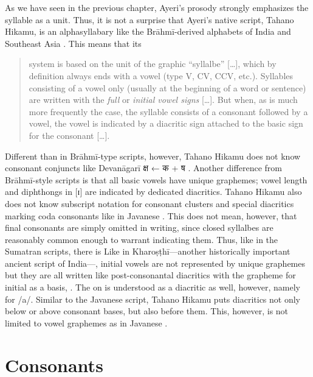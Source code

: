 As we have seen in the previous chapter, Ayeri's prosody strongly emphasizes 
the syllable as a unit. Thus, it is not a surprise that Ayeri's native script,
Tahano Hikamu, is an alphasyllabary like the Brāhmī-derived alphabets of India 
and Southeast Asia \parencites{salomon1996}{court1996}. This means that its 

\blockcquote[376]{salomon1996}{system is based on the unit of the graphic 
\enquote{syllalbe} […], which by definition always ends with a vowel (type V, 
CV, CCV, etc.). Syllables consisting of a vowel only (usually at the beginning 
of a word or sentence) are written with the \emph{full} or \emph{initial vowel 
signs} […]. But when, as is much more frequently the case, the syllable consists 
of a consonant followed by a vowel, the vowel is indicated by a diacritic sign 
attached to the basic sign for the consonant […].}

Different than in Brāhmī-type scripts, however, Tahano Hikamu does not know 
consonant conjuncts like Devanāgarī {\FS क्ष}  ← {\FS क} 
 + {\FS ष} . Another difference from Brāhmī-style scripts is 
that all basic vowels have unique graphemes; vowel length and diphthongs in [ɪ] 
are indicated by dedicated diacritics. Tahano Hikamu also does not know 
subscript notation for consonant clusters and special diacritics marking coda 
consonants like in Javanese \citep[478--479]{kuipersmcdermott1996}. This does 
not mean, however, that final consonants are simply omitted in writing, since 
closed syllalbes are reasonably common enough to warrant indicating them. Thus, 
like in the Sumatran scripts, there is 
 Like in Kharoṣṭhī---another historically important ancient script 
of India---, initial vowels are not represented by unique graphemes but they 
are all written like post-consonantal diacritics with the grapheme for initial 
 as a basis,  \citep[377]{salomon1996}. The  on  is 
understood as a diacritic as well, however, namely for /a/. Similar to the 
Javanese script, Tahano Hikamu puts diacritics not only below or above consonant 
bases, but also before them. This, however, is not limited to vowel graphemes as 
in Javanese \citep[478]{kuipersmcdermott1996}.

\section{Consonants}

